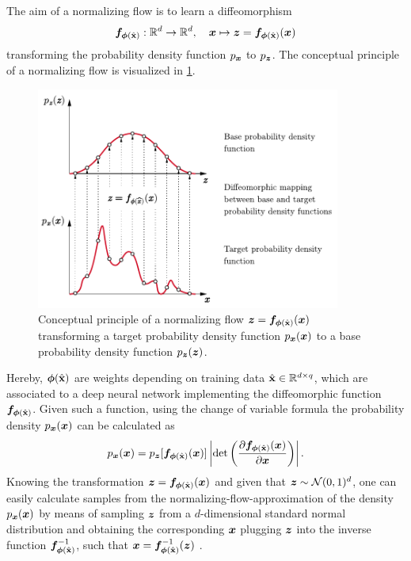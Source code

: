 \documentclass[a4paper,11pt]{report}
\def\lk#1{{\color{black}{#1}}}
\begin{document}
The aim of a normalizing flow is to learn a diffeomorphism \begin{equation}
\bm{f}_{\bm{\phi}(\hat{\boldsymbol{\mathbf{x}}})}:\mathbb{R}^d \rightarrow \mathbb{R}^d, \quad \bm{x} \mapsto \bm{z} = \bm{f}_{\bm{\phi}(\hat{\boldsymbol{\mathbf{x}}})}(\bm{x})
\end{equation} transforming the probability density function $p_{\bm{x}}$ to $p_{\bm{z}}$. The conceptual principle of a normalizing flow is visualized in \cref{fig:normflow}. 
\begin{figure}[h]
\centering
\includegraphics[width=10cm]{figures/normflow.pdf}
\caption{Conceptual principle of a normalizing flow $\bm{z} = \bm{f}_{\bm{\phi}(\hat{\boldsymbol{\mathbf{x}}})}(\bm{x})$ transforming a target probability density function $p_{\bm{x}}(\bm{x})$ to a base probability density function $p_{\bm{z}}(\bm{z})$.}
\label{fig:normflow}
\end{figure}
Hereby, $\bm{\phi}(\hat{\boldsymbol{\mathbf{x}}})$ are weights depending on training data $\hat{\boldsymbol{\mathbf{x}}} \in \mathbb{R}^{d\times q}$, which are associated to a deep neural network implementing the diffeomorphic function $\bm{f}_{\bm{\phi}(\hat{\boldsymbol{\mathbf{x}}})}$. Given such a function, using the change of variable formula the probability density $p_{\bm{x}}(\bm{x})$ can be calculated as \begin{equation}
p_{\bm{x}}(\bm{x}) = p_{\bm{z}}[\bm{f}_{\bm{\phi}(\hat{\boldsymbol{\mathbf{x}}})}(\bm{x})]\left|\det\left(\frac{\partial \bm{f}_{\bm{\phi}(\hat{\boldsymbol{\mathbf{x}}})}(\bm{x})}{\partial \bm{x}}\right)\right|.
\end{equation} Knowing the transformation $\bm{z} = \bm{f}_{\bm{\phi}(\hat{\boldsymbol{\mathbf{x}}})}(\bm{x})$ and given that $\bm{z} \sim \mathcal{N}(0,1)^d$, one can easily calculate samples from the normalizing-flow-approximation of the density $p_{\bm{x}}(\bm{x})$ by means of sampling $\bm{z}$ from a $d$-dimensional standard normal distribution and obtaining the corresponding $\bm{x}$ \lk{by} plugging $\bm{z}$ into the inverse function $\bm{f}_{\bm{\phi}(\hat{\boldsymbol{\mathbf{x}}})}^{-1}$, such that $\bm{x} = \bm{f}_{\bm{\phi}(\hat{\boldsymbol{\mathbf{x}}})}^{-1}(\bm{z})$ \lk{obtains}.
\end{document}
